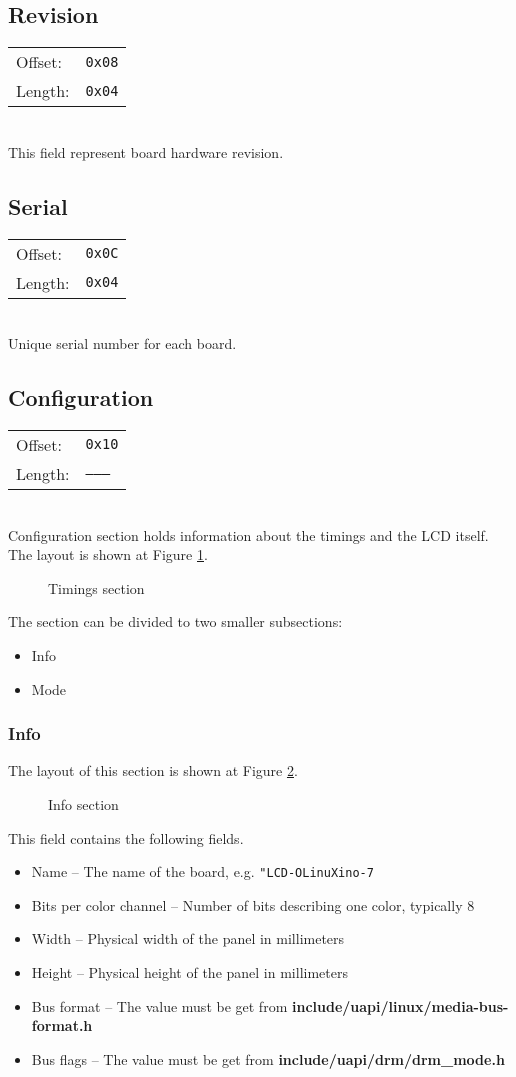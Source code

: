 \documentclass{article}
\newcommand{\regs}[2]{
	\begin{tabular}{l l}
		Offset: & \texttt{#1} \\
		Length: & \texttt{#2}
	\end{tabular} \\
	}
\begin{document}
	\subsection{Revision}
	\regs{0x08}{0x04}

	This field represent board hardware revision.

	\subsection{Serial}
	\regs{0x0C}{0x04}

	Unique serial number for each board.
	
	

	\subsection{Configuration}
	\regs{0x10}{--------}

	Configuration section holds information about the timings and the LCD itself.
	The layout is shown at Figure \ref{fig:EEPROM_CONFIG}.
	
	\begin{figure}[H]
		\centering
		
		\caption{Timings section}
		\label{fig:EEPROM_CONFIG}
	\end{figure}
	
	The section can be divided to two smaller subsections:
	\begin{itemize}
		\item Info
		\item Mode
	\end{itemize}

		\subsubsection{Info}
		The layout of this section is shown at Figure \ref{fig:EEPROM_INFO}.
		\begin{figure}[H]
			\centering
			
			\caption{Info section}
			\label{fig:EEPROM_INFO}
		\end{figure}
		
		This field contains the following fields.
		\begin{itemize}
			\item Name -- The name of the board, e.g. \texttt{"LCD-OLinuXino-7}
			\item Bits per color channel -- Number of bits describing one color, typically 8
			\item Width -- Physical width of the panel in millimeters
			\item Height -- Physical height of the panel in millimeters
			\item Bus format -- The value must be get from
			\textbf{include/uapi/linux/media-bus-format.h}
			\item Bus flags -- The value must be get from \textbf{include/uapi/drm/drm\_mode.h}
		\end{itemize}
		
\end{document}
